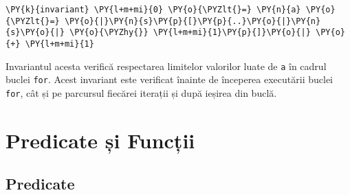\begin{sloppypar}
\begin{itemize}
    \begin{Verbatim}[commandchars=\\\{\}]
\PY{k}{invariant} \PY{l+m+mi}{0} \PY{o}{\PYZlt{}=} \PY{n}{a} \PY{o}{\PYZlt{}=} \PY{o}{|}\PY{n}{s}\PY{p}{[}\PY{p}{..}\PY{o}{|}\PY{n}{s}\PY{o}{|} \PY{o}{\PYZhy{}} \PY{l+m+mi}{1}\PY{p}{]}\PY{o}{|} \PY{o}{+} \PY{l+m+mi}{1}
\end{Verbatim}
    Invariantul acesta verifică respectarea limitelor valorilor luate de \texttt{a} în cadrul buclei \texttt{for}. Acest invariant este verificat înainte de începerea executării buclei \texttt{for}, cât și pe parcursul fiecărei iterații și după ieșirea din buclă.
\end{itemize}

\section{Predicate și Funcții}

\subsection{Predicate}


\end{sloppypar}
